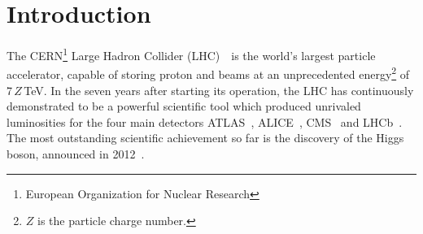 \chapter{Introduction}

The CERN\footnote{European Organization for Nuclear Research} Large Hadron Collider (LHC)~\citedr\, is the world's largest particle accelerator, capable of storing proton and \lead beams at an unprecedented energy\footnote{$Z$ is the particle charge number.} of 7$\,Z\,$TeV. In the seven years after starting its operation, the LHC has continuously demonstrated to be a powerful scientific tool which produced unrivaled luminosities for the four main detectors ATLAS~\cite{ATLASref01}, \mbox{ALICE~\cite{ALICEref01}}, CMS~\cite{CMSref01} and LHCb~\cite{LHCbref01}. The most outstanding scientific achievement so far is the discovery of the Higgs boson, announced in 2012~\cite{higgs:ATLAS,higgs:CMS}. 
%

